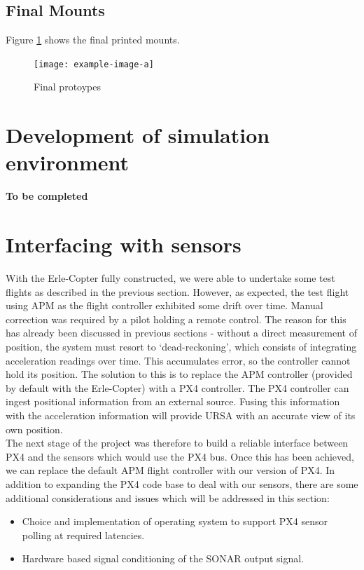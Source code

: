 \documentclass[capstone_report.tex]{subfiles}
\begin{document}
\subsection{Final Mounts}

Figure \ref{fig:final_mounts} shows the final printed mounts.

\begin{figure}[H]
    \centering
    \texttt{[image: example-image-a]}
    \caption{Final protoypes\label{fig:final_mounts}}
\end{figure}

\section{Development of simulation environment}
\textbf{To be completed}

\section{Interfacing with sensors}
    With the Erle-Copter fully constructed, we were able to undertake some test flights as described in the previous section. However, as expected, the test flight using APM as the flight controller exhibited some drift over time. Manual correction was required by a pilot holding a remote control. The reason for this has already been discussed in previous sections - without a direct measurement of position, the system must resort to `dead-reckoning', which consists of integrating acceleration readings over time. This accumulates error, so the controller cannot hold its position. The solution to this is to replace the APM controller (provided by default with the Erle-Copter) with a PX4 controller. The PX4 controller can ingest positional information from an external source. Fusing this information with the acceleration information will provide URSA with an accurate view of its own position.\\

    The next stage of the project was therefore to build a reliable interface between PX4 and the sensors which would use the PX4 bus. Once this has been achieved, we can replace the default APM flight controller with our version of PX4. In addition to expanding the PX4 code base to deal with our sensors, there are some additional considerations and issues which will be addressed in this section: 
    \begin{itemize}
        \item Choice and implementation of operating system to support PX4 sensor polling at required latencies.
        \item Hardware based signal conditioning of the SONAR output signal.
    \end{itemize}
\end{document}
